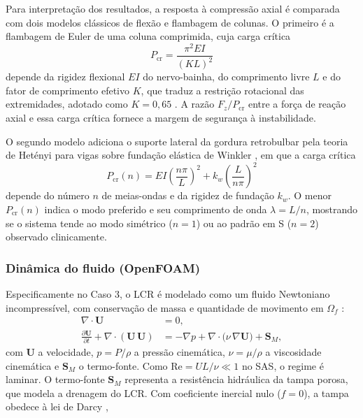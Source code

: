 \documentclass[article, hidelinks,oneside,12pt]{abntex2}
\begin{document}
Para interpretação dos resultados, a resposta à compressão axial é comparada com dois modelos clássicos de flexão e flambagem de colunas. O primeiro é a flambagem de Euler de uma coluna comprimida, cuja carga crítica
\begin{equation}
  P_{\mathrm{cr}} = \frac{\pi^2 E I}{(K L)^2}
  \label{eq:euler}
\end{equation}
depende da rigidez flexional $EI$ do nervo-bainha, do comprimento livre $L$ e do fator de comprimento efetivo $K$, que traduz a restrição rotacional das extremidades, adotado como $K = 0{,}65$ \cite{wang2016}. A razão $F_z/P_{\mathrm{cr}}$ entre a força de reação axial e essa carga crítica fornece a margem de segurança à instabilidade. 

O segundo modelo adiciona o suporte lateral da gordura retrobulbar pela teoria de Hetényi para vigas sobre fundação elástica de Winkler \cite{hetenyi1946}, em que a carga crítica
\begin{equation}
  P_{\mathrm{cr}}(n) = E I \left(\frac{n\pi}{L}\right)^{\!2} + k_w \left(\frac{L}{n\pi}\right)^{\!2}
  \label{eq:hetenyi}
\end{equation}
depende do número $n$ de meias-ondas e da rigidez de fundação $k_w$. O menor $P_{\mathrm{cr}}(n)$ indica o modo preferido e seu comprimento de onda $\lambda = L/n$, mostrando se o sistema tende ao modo simétrico ($n = 1$) ou ao padrão em S ($n = 2$) observado clinicamente.

\subsubsection*{Dinâmica do fluido (OpenFOAM)}
\label{sec:teoria-fluido}

Especificamente no Caso 3, o LCR é modelado como um fluido Newtoniano incompressível, com conservação de massa e quantidade de movimento em $\Omega_f$ \cite{ferziger, versteeg}:
\begin{align}
  \nabla\!\cdot\mathbf{U} &= 0,
  \label{eq:continuidade}\\[2pt]
  \frac{\partial \mathbf{U}}{\partial t}
  + \nabla\!\cdot(\mathbf{U}\,\mathbf{U})
  &= -\nabla p
  + \nabla\!\cdot\!\big(\nu\,\nabla\mathbf{U}\big)
  + \mathbf{S}_M,
  \label{eq:momento}
\end{align}
com $\mathbf{U}$ a velocidade, $p = P/\rho$ a pressão cinemática, $\nu = \mu/\rho$ a viscosidade cinemática e $\mathbf{S}_M$ o termo-fonte. Como $\mathrm{Re} = U L/\nu \ll 1$ no SAS, o regime é laminar. O termo-fonte $\mathbf{S}_M$ representa a resistência hidráulica da tampa porosa, que modela a drenagem do LCR. Com coeficiente inercial nulo ($f = 0$), a tampa obedece à lei de Darcy \cite{nield2006, namaghi2026},
\end{document}
